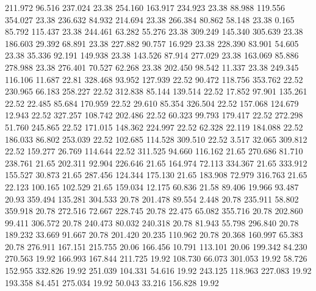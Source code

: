  211.972   96.516  237.024        23.38
 254.160  163.917  234.923        23.38
  88.988  119.556  354.027        23.38
 236.632   84.932  214.694        23.38
 266.384   80.862   58.148        23.38
   0.165   85.792  115.437        23.38
 244.461   63.282   55.276        23.38
 309.249  145.340  305.639        23.38
 186.603   29.392   68.891        23.38
 227.882   90.757   16.929        23.38
 228.390   83.901   54.605        23.38
  35.336   92.191  149.938        23.38
 143.526   87.914  277.029        23.38
 163.069   85.886  278.988        23.38
 276.401   70.527   62.268        23.38
 202.450   98.542   11.337        23.38
 249.345  116.106   11.687        22.81
 328.468   93.952  127.939        22.52
  90.472  118.756  353.762        22.52
 230.965   66.183  258.227        22.52
 312.838   85.144  139.514        22.52
  17.852   97.901  135.261        22.52
  22.485   85.684  170.959        22.52
  29.610   85.354  326.504        22.52
 157.068  124.679   12.943        22.52
 327.257  108.742  202.486        22.52
  60.323   99.793  179.417        22.52
 272.298   51.760  245.865        22.52
 171.015  148.362  224.997        22.52
  62.328   22.119  184.088        22.52
 186.033   86.802  253.039        22.52
 102.685  114.528  309.510        22.52
   3.517   32.065  309.812        22.52
 159.277   26.769  114.644        22.52
 311.525   94.660  116.162        21.65
 270.686   81.710  238.761        21.65
 202.311   92.904  226.646        21.65
 164.974   72.113  334.367        21.65
 333.912  155.527   30.873        21.65
 287.456  124.344  175.130        21.65
 183.908   72.979  316.763        21.65
  22.123  100.165  102.529        21.65
 159.034   12.175   60.836        21.58
  89.406   19.966   93.487        20.93
 359.494  135.281  304.533        20.78
 201.478   89.554    2.448        20.78
 235.911   58.802  359.918        20.78
 272.516   72.667  228.745        20.78
  22.475   65.082  355.716        20.78
 202.860   99.411  306.572        20.78
 240.473   80.032  240.318        20.78
  81.943   55.798  296.840        20.78
 189.232   33.669   91.667        20.78
 201.420   20.235  110.962        20.78
  20.368  160.997   65.383        20.78
 276.911  167.151  215.755        20.06
 166.456   10.791  113.101        20.06
 199.342   84.230  270.563        19.92
 166.993  167.844  211.725        19.92
 108.730   66.073  301.053        19.92
  58.726  152.955  332.826        19.92
 251.039  104.331   54.616        19.92
 243.125  118.963  227.083        19.92
 193.358   84.451  275.034        19.92
  50.043   33.216  156.828        19.92
